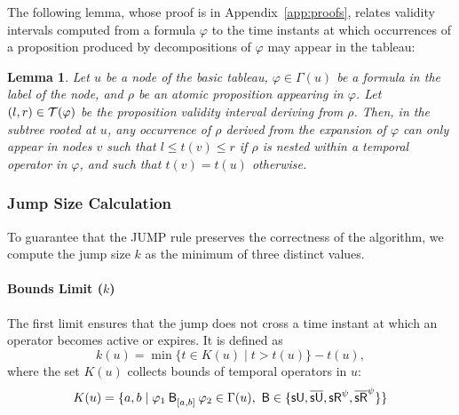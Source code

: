 \documentclass{easychair}
\newtheorem{lemma}{Lemma}
\begin{document}
The following lemma, whose proof is in Appendix~\ref{app:proofs}, relates validity intervals computed from a formula $\varphi$ to the time instants at which occurrences of a proposition produced by decompositions of $\varphi$ may appear in the tableau:
\begin{lemma}
    \label{lemma:te-limit}
    Let $u$ be a node of the basic tableau, $\varphi \in \Gamma(u)$ be a formula in the label of the node, and $\rho$ be an atomic proposition appearing in $\varphi$.
    Let $(l, r) \in \mathcal{T}(\varphi)$ be the proposition validity interval deriving from $\rho$.
    Then, in the subtree rooted at $u$, any occurrence of $\rho$ derived from the expansion of $\varphi$ can only appear in nodes $v$ such that $l \leq t(v) \leq r$ if $\rho$ is nested within a temporal operator in $\varphi$, and such that $t(v) = t(u)$ otherwise.
\end{lemma}


\subsubsection{Jump Size Calculation}
\label{sec:jump-size-calculation}

To guarantee that the \textsf{JUMP} rule preserves the correctness of the algorithm, we compute the jump size $k$ as the minimum of three distinct values.

\paragraph{Bounds Limit ($k$)} 

The first limit ensures that the jump does not cross a time instant at which an operator becomes active or expires.
%
It is defined as
%
\[
    k(u) = \min\{t\in K(u)\mid t>t(u)\} - t(u),
\]
where the set $K(u)$ collects bounds of temporal operators in $u$:
\[
    K(u) = \set{a, b\mid \anybinop{[a,b]}{\varphi_1}{\varphi_2}\in\Gamma(u),\ \mathsf{B}\in\set{\suntilop,\marked{\suntilop},\sreleaseop^\psi,\marked{\sreleaseop}^\psi}}
\]
\end{document}
